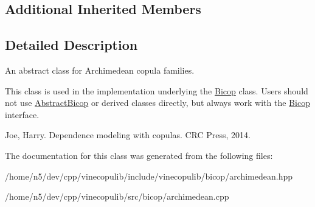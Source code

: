 \subsection*{Additional Inherited Members}


\subsection{Detailed Description}
An abstract class for Archimedean copula families. 

This class is used in the implementation underlying the \hyperlink{classvinecopulib_1_1_bicop}{Bicop} class. Users should not use \hyperlink{classvinecopulib_1_1_abstract_bicop}{Abstract\+Bicop} or derived classes directly, but always work with the \hyperlink{classvinecopulib_1_1_bicop}{Bicop} interface.

Joe, Harry. Dependence modeling with copulas. C\+RC Press, 2014. 

The documentation for this class was generated from the following files\+:\begin{DoxyCompactItemize}
\item 
/home/n5/dev/cpp/vinecopulib/include/vinecopulib/bicop/archimedean.\+hpp\item 
/home/n5/dev/cpp/vinecopulib/src/bicop/archimedean.\+cpp\end{DoxyCompactItemize}
